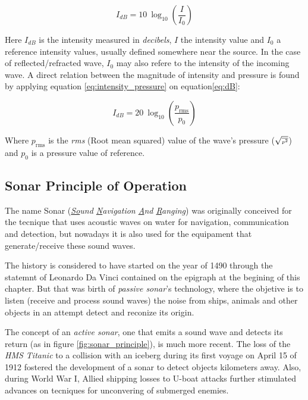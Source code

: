 \begin{equation}\label{eq:dB}
I_{dB} = 10~\log_{10}\left(\frac{I}{I_0}\right)
\end{equation} 

Here $I_{dB}$ is the intensity measured in \textit{decibels}, $I$ the intensity
value and $I_0$ a reference intensity values, usually defined somewhere near the
source. In the case of reflected/refracted wave, $I_0$ may also refere to
the intensity of the incoming wave. A direct relation between the magnitude of
intensity and pressure is found by applying equation \ref{eq:intensity_pressure}
on equation\ref{eq:dB}:

\begin{equation}\label{eq:dB}
I_{dB} = 20~\log_{10}\left(\frac{p_{\text{rms}}}{p_0}\right)
\end{equation}

Where $p_{\text{rms}}$ is the \textit{rms} (Root mean squared) value of the
wave's pressure ({\small $\sqrt{\text{\tiny \(\overline{p^2}\)}}$}) and $p_0$ is
a pressure value of reference.


\subsection{Sonar Principle of Operation}

The name Sonar (\textit{\underline{So}und \underline{N}avigation \underline{A}nd
\underline{R}anging}) was originally conceived for the tecnique that uses
acoustic waves on water for navigation, communication and detection, but
nowadays it is also used for the equipament that generate/receive these
sound waves.

The history is considered to have started on the year of 1490 through the
statemnt of Leonardo Da Vinci contained on the epigraph at the begining of this
chapter\cite{fahy1998fundamentals}. But that was birth of \textit{passive
sonar}'s technology, where the objetive is to listen (receive and process sound
waves) the noise from ships, animals and other objects in an attempt detect and
reconize its origin.

The concept of an \textit{active sonar}, one that emits a sound wave and detects
its return (as in figure \ref{fig:sonar_principle}), is much more recent. The
loss of the \textit{HMS Titanic} to a collision with an iceberg during its first
voyage on April 15 of 1912 \cite{histsonar} fostered the development of a sonar
to detect objects kilometers away. Also, during World War I,
Allied shipping losses to U-boat attacks further stimulated advances on tecniques for
unconvering of submerged enemies.

